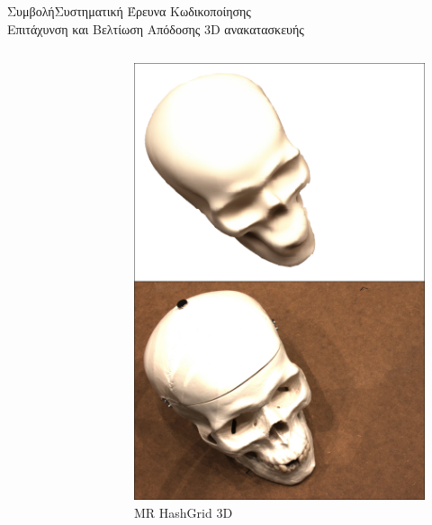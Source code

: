 \documentclass[10pt]{beamer}
\begin{document}
\begin{frame}{Συμβολή}{Συστηματική Έρευνα Κωδικοποίησης \\ Επιτάχυνση και Βελτίωση Απόδοσης 3D ανακατασκευής}
{\begin{columns}
\begin{figure}
            \end{figure}
        \begin{figure}
                \centering
                \includegraphics[height=.42\textheight]{images/RenderComparison65/MRHashGrid3D/rendering_100.jpg}
                \caption{\tiny{MR HashGrid 3D}}
                

\end{figure}
\end{columns}}
\end{frame}
\end{document}
